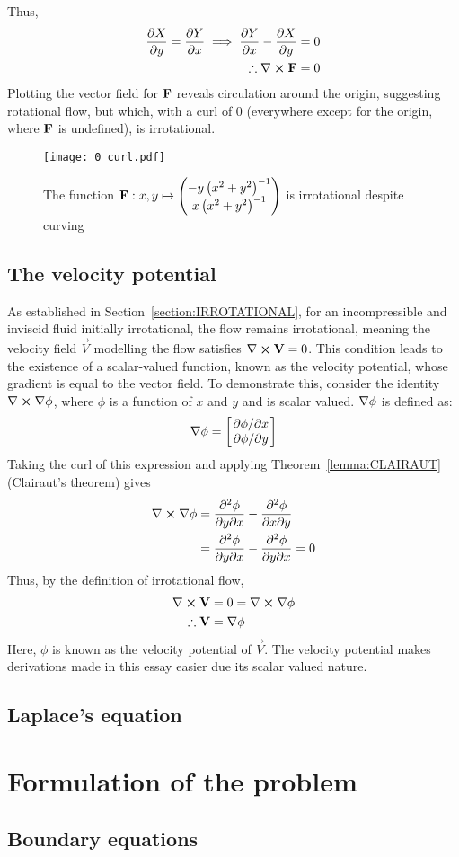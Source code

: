 Thus,
\begin{align*}
    \pdv{X}{y}=\pdv{Y}{x}\implies\pdv{Y}{x}-\pdv{X}{y}=0\\
    \therefore\curl{\fatf}=0
\end{align*}
Plotting the vector field for $\mathbf{F}$ reveals circulation around the origin, suggesting rotational flow, but which, with a curl of 0 (everywhere except for
the origin, where $\mathbf{F}$ is undefined), is irrotational.
\begin{figure*}[!ht]
    \texttt{[image: 0\_curl.pdf]}
    \centering
    \caption{The function $\mathbf{F}:x,y\mapsto\begin{pmatrix}
        -y\left(x^2+y^2\right)^{-1}\\x\left(x^2+y^2\right)^{-1}
    \end{pmatrix}$ is irrotational despite curving}
    \label{figure:ZEROCURL}
\end{figure*}


\newpage %
\subsection{The velocity potential}
As established in Section~\ref{section:IRROTATIONAL}, for an incompressible and inviscid fluid initially irrotational, the flow remains irrotational, meaning
the velocity field $\vec{V}$ modelling the flow satisfies $\curl{\vec{V}}=0$. This condition leads to the existence of a scalar-valued function, known as the
velocity potential, whose gradient is equal to the vector field. To demonstrate this, consider the identity $\curl{\gradient{\phi}}$, where $\phi$ is a
function of $x$ and $y$ and is scalar valued. $\nabla\phi$ is defined as:
$$
    \nabla\phi=\begin{bmatrix}
        \pdv*{\phi}{x}\\
        \pdv*{\phi}{y}
    \end{bmatrix}
$$
Taking the curl of this expression and applying Theorem~\ref{lemma:CLAIRAUT} (Clairaut's theorem) gives
\begin{align*}
    \curl{\gradient{\phi}}&=\pdv{\phi}{y}{x}-\pdv{\phi}{x}{y}\\
                             &=\pdv{\phi}{y}{x}-\pdv{\phi}{y}{x}=0
\end{align*}
Thus, by the definition of irrotational flow,
\begin{align*}
    \curl{\vec{V}}&=0=\curl{\gradient{\phi}}\\
    \therefore\vec{V}&=\gradient{\phi}
\end{align*}
Here, $\phi$ is known as the velocity potential of $\vec{V}$. The velocity potential makes derivations made in this essay easier due its scalar valued nature.

\subsection{Laplace's equation}

\section{Formulation of the problem}
\subsection{Boundary equations}